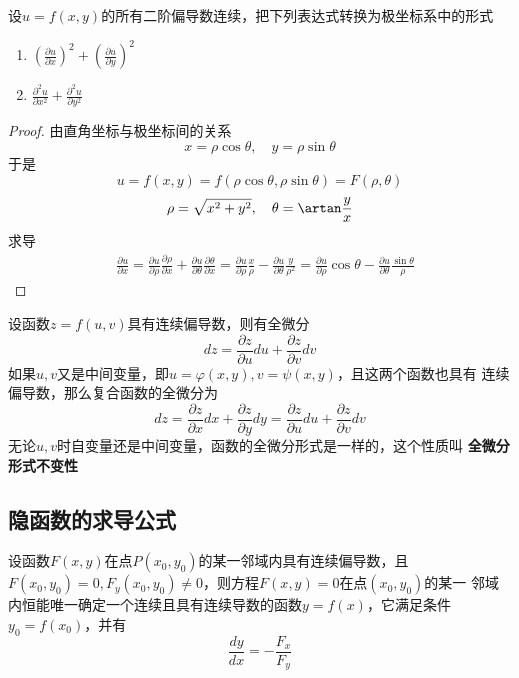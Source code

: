 \documentclass[11pt]{article}
\begin{document}
\begin{proposition}[]
设\(u=f(x,y)\)的所有二阶偏导数连续，把下列表达式转换为极坐标系中的形式
\begin{enumerate}
\item \((\frac{\partial u}{\partial x})^2+(\frac{\partial u}{\partial y})^2\)
\item \(\frac{\partial^2u}{\partial x^2}+\frac{\partial^2u}{\partial y^2}\)
\end{enumerate}
\end{proposition}

\begin{proof}
由直角坐标与极坐标间的关系
\begin{equation*}
x=\rho\cos\theta,\quad y=\rho\sin\theta
\end{equation*}
于是
\begin{equation*}
u=f(x,y)=f(\rho\cos\theta,\rho\sin\theta)=F(\rho,\theta)
\end{equation*}
\begin{equation*}
\rho=\sqrt{x^2+y^2},\quad\theta=\artan\frac{y}{x}
\end{equation*}
求导
\begin{align*}
&\frac{\partial u}{\partial x}=\frac{\partial u}{\partial \rho}\frac{\partial \rho}{\partial x}+\frac{\partial u}{\partial \theta}\frac{\partial \theta}{\partial x}=
\frac{\partial u}{\partial\rho}\frac{x}{\rho}-\frac{\partial u}{\partial \theta}\frac{y}{\rho^2}=
\frac{\partial u}{\partial \rho}\cos\theta-\frac{\partial u}{\partial \theta}\frac{\sin\theta}{\rho}
\end{align*}
\end{proof}

设函数\(z=f(u,v)\)具有连续偏导数，则有全微分
\begin{equation*}
dz=\frac{\partial z}{\partial u}du+\frac{\partial z}{\partial v}dv
\end{equation*}
如果\(u,v\)又是中间变量，即\(u=\varphi(x,y),v=\psi(x,y)\)，且这两个函数也具有
连续偏导数，那么复合函数的全微分为
\begin{equation*}
dz=\frac{\partial z}{\partial x}dx+\frac{\partial z}{\partial y}dy=\frac{\partial z}{\partial u}du+\frac{\partial z}{\partial v}dv
\end{equation*}
无论\(u,v\)时自变量还是中间变量，函数的全微分形式是一样的，这个性质叫 \textbf{全微分
形式不变性}
\subsection{隐函数的求导公式}
\label{sec:orgb6d0c97}
\begin{theorem}[隐函数存在定理 1]
设函数\(F(x,y)\)在点\(P(x_0,y_0)\)的某一邻域内具有连续偏导数，且
\(F(x_0,y_0)=0,F_y(x_0,y_0)\neq0\)，则方程\(F(x,y)=0\)在点\((x_0,y_0)\)的某一
邻域内恒能唯一确定一个连续且具有连续导数的函数\(y=f(x)\)，它满足条件
\(y_0=f(x_0)\)，并有
\begin{equation*}
\frac{dy}{dx}=-\frac{F_x}{F_y}
\end{equation*}
\end{theorem}
\end{document}

